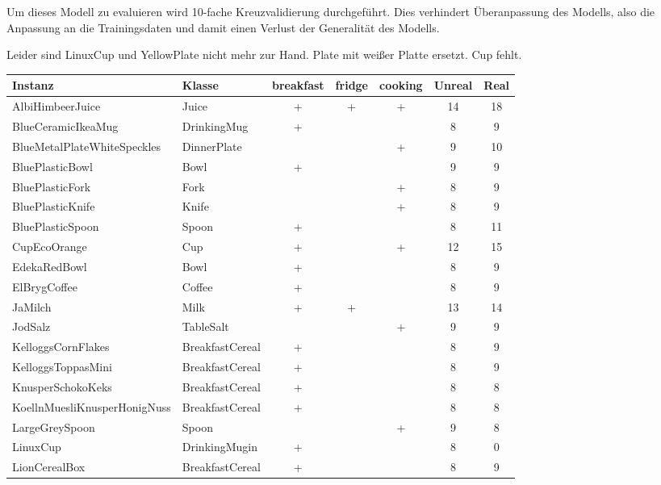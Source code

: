 Um dieses Modell zu evaluieren wird 10-fache Kreuzvalidierung durchgeführt. Dies verhindert Überanpassung des Modells, also die Anpassung an die Trainingsdaten und damit einen Verlust der Generalität des Modells.    
  
Leider sind LinuxCup und YellowPlate nicht mehr zur Hand. Plate mit weißer Platte ersetzt. Cup fehlt.

\begin{table}
\begin{tabularx}{\textwidth}{llccccc}
\textbf{Instanz}  				& \textbf{Klasse}	& \textbf{breakfast}	& \textbf{fridge}	& \textbf{cooking}	& \textbf{Unreal} & \textbf{Real} \\ \hline
AlbiHimbeerJuice				& Juice				& +			& +			& +			& 14	& 18	\\
BlueCeramicIkeaMug				& DrinkingMug		& +			& 			&			& 8		& 9\\
BlueMetalPlateWhiteSpeckles		& DinnerPlate		& 			& 			&	+		& 9		& 10\\
BluePlasticBowl					& Bowl				& +			& 			&			& 9		& 9\\
BluePlasticFork					& Fork				& 			& 			&	+		& 8		& 9\\
BluePlasticKnife				& Knife				& 			& 			&	+		& 8		& 9\\
BluePlasticSpoon				& Spoon				& +			& 			&			& 8		& 11\\
CupEcoOrange					& Cup				& +			& 			&	+		& 12	& 15\\
EdekaRedBowl					& Bowl				& +			& 			&			& 8		& 9\\
ElBrygCoffee					& Coffee			& +			& 			&			& 8		& 9\\
JaMilch							& Milk				& +			& +			&			& 13	& 14\\
JodSalz							& TableSalt			& 			& 			&	+		& 9		& 9\\
KelloggsCornFlakes				& BreakfastCereal	& +			& 			&			& 8		& 9\\
KelloggsToppasMini				& BreakfastCereal	& +			& 			&			& 8		& 9\\
KnusperSchokoKeks				& BreakfastCereal	& +			& 			&			& 8		& 8\\
KoellnMuesliKnusperHonigNuss	& BreakfastCereal	& +			& 			&			& 8		& 8	\\
LargeGreySpoon					& Spoon				& 			& 			&	+		& 9		& 8	\\
LinuxCup						& DrinkingMugin		& +			& 			&			& 8		& 0\\
LionCerealBox					& BreakfastCereal	& +			& 			&			& 8		& 9	\\

\end{tabularx}
\end{table}
